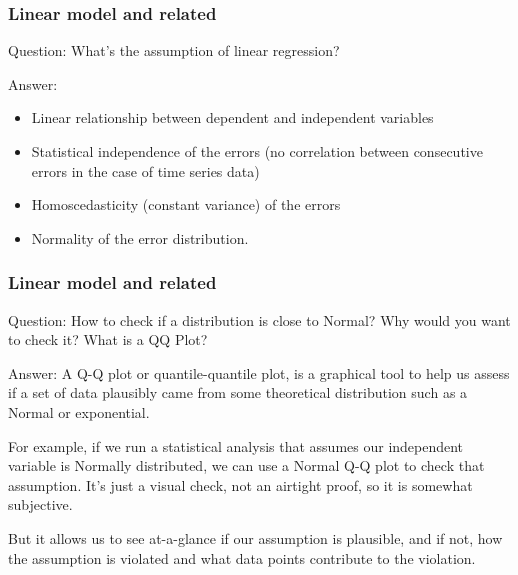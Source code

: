 \documentclass[11pt]{beamer}
\begin{document}
\begin{frame}
\frametitle{Linear model and related}
\begin{block}{Question:}
	What’s the assumption of linear regression?
\end{block}
\begin{block}{Answer:}
	\begin{itemize}
		\item Linear relationship between dependent and independent variables
		\item Statistical independence of the errors (no correlation between consecutive errors in the case of time series data)
		\item Homoscedasticity (constant variance) of the errors
		\item Normality of the error distribution.
	\end{itemize}
\end{block}
\end{frame}

\begin{frame}
\frametitle{Linear model and related}
\begin{block}{Question:}
	How to check if a distribution is close to Normal? Why would you want to check it? What is a QQ Plot?
\end{block}
\begin{block}{Answer:}
	A Q-Q plot or quantile-quantile plot, is a graphical tool to help us assess if a set of data plausibly came from some theoretical distribution such as a Normal or exponential. 
	
	For example, if we run a statistical analysis that assumes our independent variable is Normally distributed, we can use a Normal Q-Q plot to check that assumption. It’s just a visual check, not an airtight proof, so it is somewhat subjective. 
	
	But it allows us to see at-a-glance if our assumption is plausible, and if not, how the assumption is violated and what data points contribute to the violation.
\end{block}
\end{frame}
\end{document}
